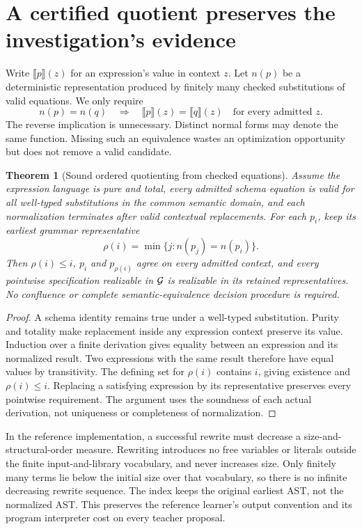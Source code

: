 \documentclass[11pt,letterpaper]{article}
\theoremstyle{plain}
\newtheorem{theorem}{Theorem}[section]
\theoremstyle{definition}
\begin{document}
\section{A certified quotient preserves the investigation's evidence}\label{sec:ordered-quotient}
Write $\llbracket p\rrbracket(z)$ for an expression's value in context $z$. Let $n(p)$ be a deterministic representation produced by finitely many checked substitutions of valid equations. We only require
\[
 n(p)=n(q)\quad\Longrightarrow\quad
 \llbracket p\rrbracket(z)=\llbracket q\rrbracket(z)
 \quad\text{for every admitted }z.
\]
The reverse implication is unnecessary. Distinct normal forms may denote the same function. Missing such an equivalence wastes an optimization opportunity but does not remove a valid candidate.

\begin{theorem}[Sound ordered quotienting from checked equations]\label{thm:certified-quotient}
Assume the expression language is pure and total, every admitted schema equation is valid for all well-typed substitutions in the common semantic domain, and each normalization terminates after valid contextual replacements. For each $p_i$, keep its earliest grammar representative
\[
 \rho(i)=\min\{j:n(p_j)=n(p_i)\}.
\]
Then $\rho(i)\le i$, $p_i$ and $p_{\rho(i)}$ agree on every admitted context, and every pointwise specification realizable in $\mathcal G$ is realizable in its retained representatives. No confluence or complete semantic-equivalence decision procedure is required.
\end{theorem}
\begin{proof}
A schema identity remains true under a well-typed substitution. Purity and totality make replacement inside any expression context preserve its value. Induction over a finite derivation gives equality between an expression and its normalized result. Two expressions with the same result therefore have equal values by transitivity. The defining set for $\rho(i)$ contains $i$, giving existence and $\rho(i)\le i$. Replacing a satisfying expression by its representative preserves every pointwise requirement. The argument uses the soundness of each actual derivation, not uniqueness or completeness of normalization.
\end{proof}

In the reference implementation, a successful rewrite must decrease a size-and-structural-order measure. Rewriting introduces no free variables or literals outside the finite input-and-library vocabulary, and never increases size. Only finitely many terms lie below the initial size over that vocabulary, so there is no infinite decreasing rewrite sequence. The index keeps the original earliest AST, not the normalized AST. This preserves the reference learner's output convention and its program interpreter cost on every teacher proposal.
\end{document}
